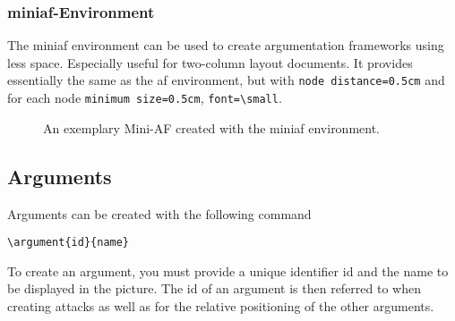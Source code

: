 \documentclass{article}
\begin{document}
\subsubsection{\textsf{miniaf}-Environment}
    The \textsf{miniaf} environment can be used to create argumentation frameworks using less space.
    Especially useful for two-column layout documents.
    It provides essentially the same as the \textsf{af} environment, but with \verb|node distance=0.5cm| and for each node \verb|minimum size=0.5cm|, \verb|font=\small|.


\begin{figure}[ht]
    \centering
    \begin{miniaf}





    \end{miniaf}
    \caption{An exemplary Mini-AF created with the \textsf{miniaf} environment.}
    \label{fig:example_mini}
\end{figure}


\subsection{Arguments}
    Arguments can be created with the following command

    \verb|\argument{id}{name}|

    \noindent
    To create an argument, you must provide a unique identifier \textsf{id} and the \textsf{name} to be displayed in the picture.
    The \textsf{id} of an argument is then referred to when creating attacks as well as for the relative positioning of the other arguments.
\end{document}
